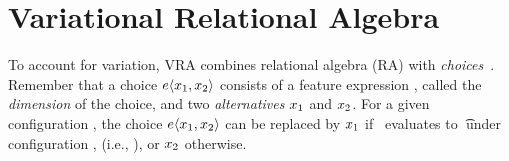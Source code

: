\section{Variational Relational Algebra}
\label{sec:vrel-alg}


To account for variation, VRA combines relational algebra (RA) with 
\emph{choices}~\cite{EW11tosem,HW16fosd,Walk13thesis}.
Remember that a choice $\chc{\elem_1,\elem_2}$ consists of a feature expression \dimMeta, called
the \emph{dimension} of the choice, and 
two \emph{alternatives} $\elem_1$ and $\elem_2$. For a given configuration \config, 
the choice $\chc{\elem_1, \elem_2}$ can be replaced by $\elem_1$ if \dimMeta\
evaluates to \t\ under configuration \config, (i.e., \fSem{\dimMeta}),
or $\elem_2$ otherwise. 




